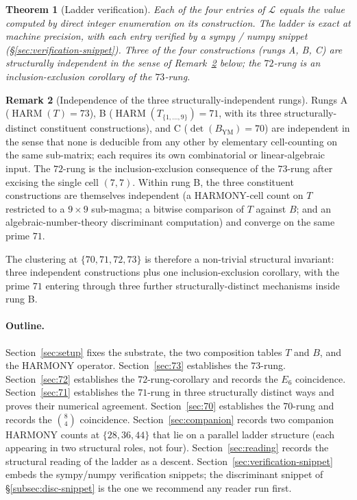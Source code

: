 \documentclass[11pt,reqno]{amsart}
\newtheorem{theorem}{Theorem}[section]
\theoremstyle{definition}
\newtheorem{remark}[theorem]{Remark}
\DeclareMathOperator{\HARM}{HARM}
\begin{document}
\begin{theorem}[Ladder verification]
\label{thm:ladder}
Each of the four entries of $\mathcal{L}$ equals the value computed
by direct integer enumeration on its construction. The ladder is
exact at machine precision, with each entry verified by a sympy /
numpy snippet (§\ref{sec:verification-snippet}). Three of the four
constructions (rungs A, B, C) are structurally independent in the
sense of Remark~\ref{rem:independence} below; the $72$-rung is an
inclusion-exclusion corollary of the $73$-rung.
\end{theorem}

\begin{remark}[Independence of the three structurally-independent
rungs]
\label{rem:independence}
Rungs A ($\HARM(T) = 73$), B ($\HARM(T_{\{1,\ldots,9\}}) = 71$, with
its three structurally-distinct constituent constructions), and C
($\det(B_{\mathrm{YM}}) = 70$) are independent in the sense that none
is deducible from any other by elementary cell-counting on the same
sub-matrix; each requires its own combinatorial or linear-algebraic
input. The $72$-rung is the inclusion-exclusion consequence of the
$73$-rung after excising the single cell $(7, 7)$. Within rung B,
the three constituent constructions are themselves independent (a
HARMONY-cell count on $T$ restricted to a $9 \times 9$ sub-magma; a
bitwise comparison of $T$ against $B$; and an algebraic-number-theory
discriminant computation) and converge on the same prime $71$.
\end{remark}

The clustering at $\{70, 71, 72, 73\}$ is therefore a non-trivial
structural invariant: three independent constructions plus one
inclusion-exclusion corollary, with the prime $71$ entering through
three further structurally-distinct mechanisms inside rung B.

\paragraph{Outline.}

Section~\ref{sec:setup} fixes the substrate, the two composition
tables $T$ and $B$, and the HARMONY operator. Section~\ref{sec:73}
establishes the $73$-rung. Section~\ref{sec:72} establishes the
$72$-rung-corollary and records the $E_6$ coincidence.
Section~\ref{sec:71} establishes the $71$-rung in three structurally
distinct ways and proves their numerical agreement.
Section~\ref{sec:70} establishes the $70$-rung and records the
$\binom{8}{4}$ coincidence. Section~\ref{sec:companion} records two
companion HARMONY counts at $\{28, 36, 44\}$ that lie on a parallel
ladder structure (each appearing in two structural roles, not four).
Section~\ref{sec:reading} records the structural reading of the
ladder as a descent. Section~\ref{sec:verification-snippet} embeds
the sympy/numpy verification snippets; the discriminant snippet of
§\ref{subsec:disc-snippet} is the one we recommend any reader run
first.
\end{document}
